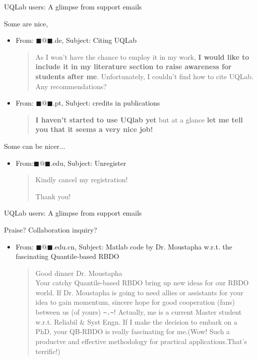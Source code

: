 \documentclass[]{rsuqbeamernew}
\begin{document}
\begin{frame}{UQLab users: A glimpse from support emails}

Some are nice,
\begin{itemize}
  \item From: $\blacksquare@\blacksquare$.de, Subject: Citing UQLab
  \begin{quotation}
    As I won't have the chance to employ it in my work, \textbf{I would like to include it in my literature section to raise awareness for students after me}.
    Unfortunately, I couldn't find how to cite UQLab. Any recommendations?
  \end{quotation}
  \item From: $\blacksquare@\blacksquare$.pt, Subject: credits in publications
  \begin{quotation}
    \textbf{I haven't started to use UQlab yet} but at a glance \textbf{let me tell you that it seems a very nice job!}
  \end{quotation}
\end{itemize}

Some can be nicer...
\begin{itemize}
  \item From:$\blacksquare@\blacksquare$.edu, Subject: Unregister
  \begin{quotation}
    Kindly cancel my registration!
    
    Thank you!
  \end{quotation}
\end{itemize}

\end{frame}

\begin{frame}{UQLab users: A glimpse from support emails}

Praise? Collaboration inquiry?
\begin{itemize}
  \item From: $\blacksquare@\blacksquare$.edu.cn, Subject: Matlab code by Dr. Moustapha w.r.t. the fascinating Quantile-based RBDO
  \begin{quotation}
    Good dinner Dr. Moustapha \\
    Your catchy Quantile-based RBDO bring up new ideas for our RBDO world.
    If Dr. Moustapha is going to need allies or assistants for your idea to gain momentum, sincere hope for good cooperation (fans) between us (of yours) \texttt{\textasciitilde.\textasciitilde}!
    Actually, me is a current Master student w.r.t. Reliabil \& Syst Engn.
    If I make the decision to embark on a PhD, your QB-RBDO is really fascinating for me.(Wow! Such a productve and effective methodology for practical applications.That's terrific!)
  \end{quotation}
\end{itemize}

\end{frame}
\end{document}
